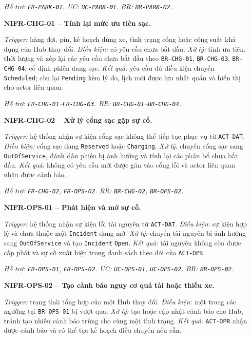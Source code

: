 \textit{Hỗ trợ: \texttt{FR-PARK-01}. UC: \texttt{UC-PARK-01}. BR: \texttt{BR-PARK-02}.}

\medskip
\noindent\textbf{NIFR-CHG-01 -- Tính lại mức ưu tiên sạc.}\par
\nopagebreak[4]
\textit{Trigger:} hàng đợi, pin, kế hoạch dùng xe, tình trạng cổng hoặc công suất khả dụng của Hub thay đổi. \textit{Điều kiện:} có yêu cầu chưa bắt đầu. \textit{Xử lý:} tính ưu tiên, thời lượng và xếp lại các yêu cầu chưa bắt đầu theo \texttt{BR-CHG-01}, \texttt{BR-CHG-03}, \texttt{BR-CHG-04}; cố định phiên đang sạc. \textit{Kết quả:} yêu cầu đủ điều kiện chuyển \texttt{Scheduled}; còn lại \texttt{Pending} kèm lý do, lịch mới được lưu nhất quán và hiển thị cho actor liên quan.

\textit{Hỗ trợ: \texttt{FR-CHG-01}--\texttt{FR-CHG-03}. BR: \texttt{BR-CHG-01}--\texttt{BR-CHG-04}.}

\medskip
\noindent\textbf{NIFR-CHG-02 -- Xử lý cổng sạc gặp sự cố.}\par
\nopagebreak[4]
\textit{Trigger:} hệ thống nhận sự kiện cổng sạc không thể tiếp tục phục vụ từ \texttt{ACT-DAT}. \textit{Điều kiện:} cổng sạc đang \texttt{Reserved} hoặc \texttt{Charging}. \textit{Xử lý:} chuyển cổng sạc sang \texttt{OutOfService}, đánh dấu phiên bị ảnh hưởng và tính lại các phân bổ chưa bắt đầu. \textit{Kết quả:} không có yêu cầu mới được gán vào cổng lỗi và actor liên quan nhận được cảnh báo.

\textit{Hỗ trợ: \texttt{FR-CHG-02}, \texttt{FR-OPS-02}. BR: \texttt{BR-CHG-02}, \texttt{BR-OPS-02}.}

\medskip
\noindent\textbf{NIFR-OPS-01 -- Phát hiện và mở sự cố.}\par
\nopagebreak[4]
\textit{Trigger:} hệ thống nhận sự kiện lỗi tài nguyên từ \texttt{ACT-DAT}. \textit{Điều kiện:} sự kiện hợp lệ và chưa thuộc một \texttt{Incident} đang mở. \textit{Xử lý:} chuyển tài nguyên bị ảnh hưởng sang \texttt{OutOfService} và tạo \texttt{Incident} \texttt{Open}. \textit{Kết quả:} tài nguyên không còn được cấp phát và sự cố xuất hiện trong danh sách theo dõi của \texttt{ACT-OPR}.

\textit{Hỗ trợ: \texttt{FR-OPS-01}, \texttt{FR-OPS-02}. UC: \texttt{UC-OPS-01}, \texttt{UC-OPS-02}. BR: \texttt{BR-OPS-02}.}

\medskip
\noindent\textbf{NIFR-OPS-02 -- Tạo cảnh báo nguy cơ quá tải hoặc thiếu xe.}\par
\nopagebreak[4]
\textit{Trigger:} trạng thái tổng hợp của một Hub thay đổi. \textit{Điều kiện:} một trong các ngưỡng tại \texttt{BR-OPS-01} bị vượt qua. \textit{Xử lý:} tạo hoặc cập nhật cảnh báo cho Hub, tránh tạo nhiều cảnh báo trùng cho cùng một tình trạng. \textit{Kết quả:} \texttt{ACT-OPR} nhận được cảnh báo và có thể tạo kế hoạch điều chuyển nếu cần.

